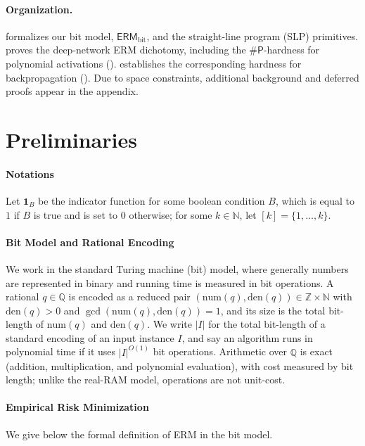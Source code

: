 \documentclass{article}
\theoremstyle{plain}
\theoremstyle{definition}
\theoremstyle{remark}
\begin{document}
\paragraph{Organization.}
 formalizes our bit model, $\mathsf{ERM}_{\text{bit}}$, and the straight-line program (SLP) primitives.
 proves the deep-network ERM dichotomy, including the $\#\mathsf{P}$-hardness for polynomial activations (). 
 establishes the corresponding hardness for backpropagation ().
Due to space constraints, additional background and deferred proofs appear in the appendix.

\section{Preliminaries}
\label{sec:prel}


\paragraph{Notations} Let $\mathbf{1}_{B}$ be the indicator function for some boolean condition $B$, which is equal to $1$ if $B$ is true and is set to $0$ otherwise; for some $k \in \mathbb{N}$, let $[k] = \{1,\ldots,k\}$.


\paragraph{Bit Model and Rational Encoding}
We work in the standard Turing machine (bit) model, where generally numbers are represented in binary and running time is measured in bit operations. A rational $q\in\mathbb{Q}$ is encoded as a reduced pair $(\mathrm{num}(q),\mathrm{den}(q))\in\mathbb{Z}\times\mathbb{N}$ with $\mathrm{den}(q)>0$ and $\gcd(\mathrm{num}(q),\mathrm{den}(q))=1$, and its size is the total bit-length of $\mathrm{num}(q)$ and $\mathrm{den}(q)$. We write $|I|$ for the total bit-length of a standard encoding of an input instance $I$, and say an algorithm runs in polynomial time if it uses ${|I|}^{O(1)}$ bit operations. Arithmetic over $\mathbb{Q}$ is exact (addition, multiplication, and polynomial evaluation), with cost measured by bit length; unlike the real-RAM model, operations are not unit-cost. 


\paragraph{Empirical Risk Minimization}
We give below the formal definition of ERM in the bit model. 
\end{document}
